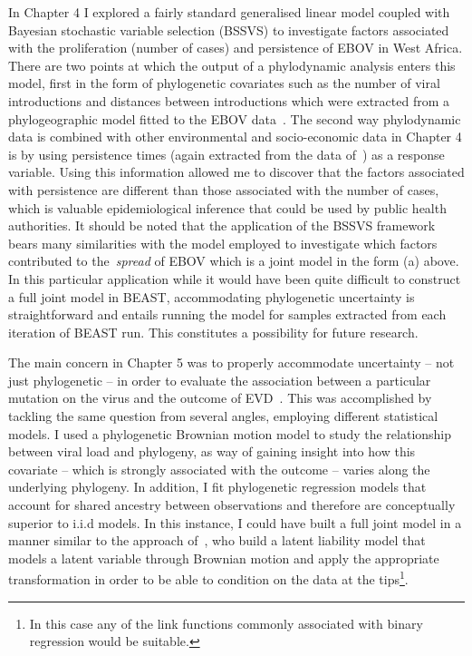 In Chapter 4 I explored a fairly standard generalised linear model coupled with Bayesian stochastic variable selection (BSSVS) to investigate factors associated with the proliferation (number of cases) and persistence of EBOV in West Africa.
There are two points at which the output of a phylodynamic analysis enters this model, first in the form of phylogenetic covariates such as the number of viral introductions and distances between introductions which were extracted from a phylogeographic model fitted to the EBOV data~\citep{Dudas2017}.
The second way phylodynamic data is combined with other environmental and socio-economic data in Chapter 4 is by using persistence times (again extracted from the data of~\cite{Dudas2017}) as a response variable.
Using this information allowed me to discover that the factors associated with persistence are different than those associated with the number of cases, which is valuable epidemiological inference that could be used by public health authorities.
It should be noted that the application of the BSSVS framework bears many similarities with the model employed to investigate which factors contributed to the~\textit{spread} of EBOV which is a joint model in the form (a) above.
In this particular application while it would have been quite difficult to construct a full joint model in BEAST, accommodating phylogenetic uncertainty is straightforward and entails running the model for samples extracted from each iteration of BEAST run.
This constitutes a possibility for future research.

The main concern in Chapter 5 was to properly accommodate uncertainty -- not just phylogenetic -- in order to evaluate the association between a particular mutation on the virus and the outcome of EVD~\citep{Diehl2016}.
This was accomplished by tackling the same question from several angles, employing different statistical models.
I used a  phylogenetic Brownian motion model to study the relationship between viral load and phylogeny, as way of gaining insight into how this covariate -- which is strongly associated with the outcome -- varies along the underlying phylogeny.
In addition, I fit phylogenetic regression models that account for shared ancestry between observations and therefore are conceptually superior to i.i.d models.
In this instance, I could have built a full joint model in a manner similar to the approach of~\cite{Cybis2015}, who build a latent liability model that models a latent variable through Brownian motion and apply the appropriate transformation in order to be able to condition on the data at the tips\footnote{In this case any of the link functions commonly associated with binary regression would be suitable.}.

